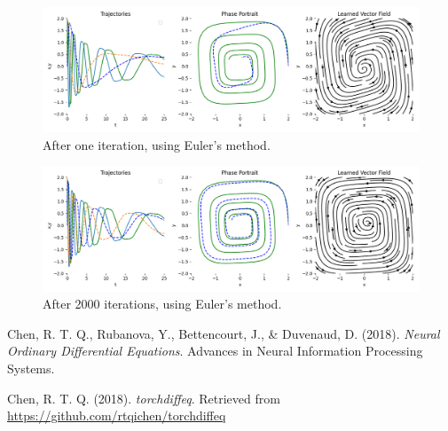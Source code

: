 \documentclass[11pt]{article}
\begin{document}
\begin{figure}
  \centering
  \includegraphics*[width=\linewidth]{000_euler.png}
  \caption{After one iteration, using Euler's method.}
  \label{fig:first_iteration_euler}
\end{figure}

\begin{figure}
  \centering
  \includegraphics*[width=\linewidth]{099_euler.png}
  \caption{After 2000 iterations, using Euler's method.}
  \label{fig:last_iteration_euler}
\end{figure}

\begin{thebibliography}{9}

    Chen, R. T. Q., Rubanova, Y., Bettencourt, J., \& Duvenaud, D. (2018).
    \textit{Neural Ordinary Differential Equations}.
    Advances in Neural Information Processing Systems.

    Chen, R. T. Q. (2018).
    \textit{torchdiffeq}.
    Retrieved from \url{https://github.com/rtqichen/torchdiffeq}

\end{thebibliography}
\end{document}

